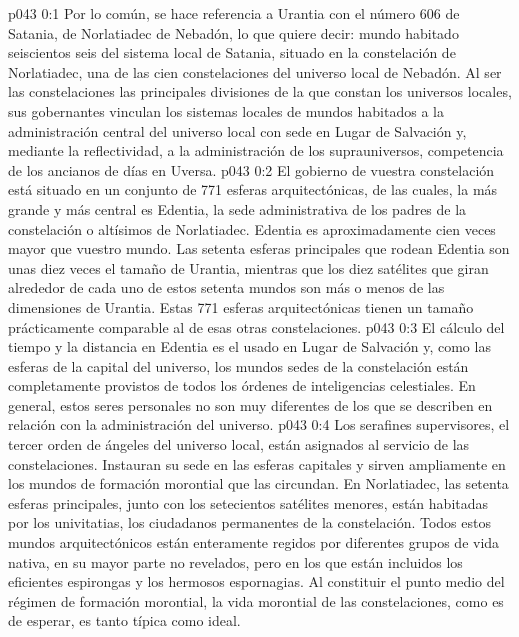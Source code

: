 \author{Malavatia Melquisedec}
\vs p043 0:1 Por lo común, se hace referencia a Urantia con el número 606 de Satania, de Norlatiadec de Nebadón, lo que quiere decir: mundo habitado seiscientos seis del sistema local de Satania, situado en la constelación de Norlatiadec, una de las cien constelaciones del universo local de Nebadón. Al ser las constelaciones las principales divisiones de la que constan los universos locales, sus gobernantes vinculan los sistemas locales de mundos habitados a la administración central del universo local con sede en Lugar de Salvación y, mediante la reflectividad, a la administración de los suprauniversos, competencia de los ancianos de días en Uversa.
\vs p043 0:2 \pc El gobierno de vuestra constelación está situado en un conjunto de 771 esferas arquitectónicas, de las cuales, la más grande y más central es Edentia, la sede administrativa de los padres de la constelación o altísimos de Norlatiadec. Edentia es aproximadamente cien veces mayor que vuestro mundo. Las setenta esferas principales que rodean Edentia son unas diez veces el tamaño de Urantia, mientras que los diez satélites que giran alrededor de cada uno de estos setenta mundos son más o menos de las dimensiones de Urantia. Estas 771 esferas arquitectónicas tienen un tamaño prácticamente comparable al de esas otras constelaciones.
\vs p043 0:3 \pc El cálculo del tiempo y la distancia en Edentia es el usado en Lugar de Salvación y, como las esferas de la capital del universo, los mundos sedes de la constelación están completamente provistos de todos los órdenes de inteligencias celestiales. En general, estos seres personales no son muy diferentes de los que se describen en relación con la administración del universo.
\vs p043 0:4 Los serafines supervisores, el tercer orden de ángeles del universo local, están asignados al servicio de las constelaciones. Instauran su sede en las esferas capitales y sirven ampliamente en los mundos de formación morontial que las circundan. En Norlatiadec, las setenta esferas principales, junto con los setecientos satélites menores, están habitadas por los univitatias, los ciudadanos permanentes de la constelación. Todos estos mundos arquitectónicos están enteramente regidos por diferentes grupos de vida nativa, en su mayor parte no revelados, pero en los que están incluidos los eficientes espirongas y los hermosos espornagias. Al constituir el punto medio del régimen de formación morontial, la vida morontial de las constelaciones, como es de esperar, es tanto típica como ideal.
